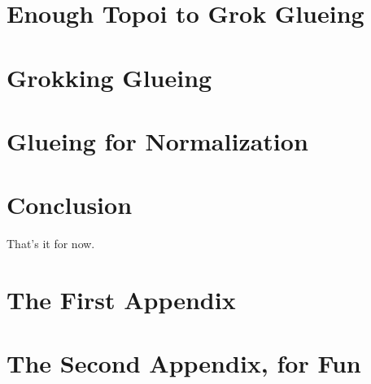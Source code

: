 \documentclass[12pt,twoside]{reedthesis}
\theoremstyle{definition}
\theoremstyle{remark}
\theoremstyle{plain}
\begin{document}
\chapter{Enough Topoi to Grok Glueing}
\chapter{Grokking Glueing}
\chapter{Glueing for Normalization}

\chapter*{Conclusion}
\setcounter{chapter}{4}
\setcounter{section}{0}

That's it for now.

\appendix
\chapter{The First Appendix}
\chapter{The Second Appendix, for Fun}



\backmatter%

\nocite{*}


% 


\end{document}
